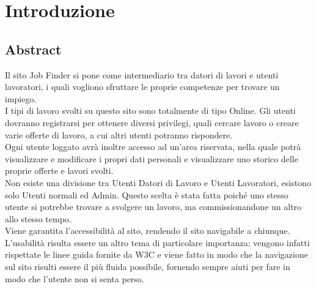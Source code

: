 \section{Introduzione}
	\subsection{Abstract}
	Il sito Job Finder si pone come intermediario tra datori di lavori e utenti lavoratori, i quali vogliono sfruttare le proprie competenze per trovare un impiego.\\
  I tipi di lavoro svolti su questo sito sono totalmente di tipo Online. 
	Gli utenti dovranno registrarsi per ottenere diversi privilegi, quali cercare lavoro o creare varie offerte di lavoro, a cui altri utenti potranno rispondere.\\
  Ogni utente loggato avrà inoltre accesso ad un’area riservata, nella quale potrà visualizzare e modificare i propri dati personali e visualizzare uno storico delle proprie offerte e lavori svolti.\\
  Non esiste una divisione tra Utenti Datori di Lavoro e Utenti Lavoratori, esistono solo Utenti normali ed Admin. Questo scelta è stata fatta poiché uno stesso utente si potrebbe trovare a svolgere un lavoro, ma commissionandone un altro allo stesso tempo.\\
  Viene garantita l’accessibilità al sito, rendendo il sito navigabile a chiunque.
  \\
  L’usabilità risulta essere un altro tema di particolare importanza: vengono infatti rispettate le linee guida fornite da W3C e viene fatto in modo che la navigazione sul sito risulti essere il più fluida possibile, fornendo sempre aiuti per fare in modo che l’utente non si senta perso.
	